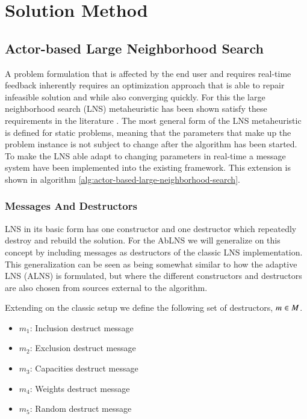 \section{Solution Method}
\label{sec:2-solution-method}

\subsection{Actor-based Large Neighborhood Search}
A problem formulation that is affected by the end user and requires real-time feedback
inherently requires an optimization approach that is able to repair infeasible solution
and while also converging quickly. For this the large neighborhood search (LNS)
metaheuristic has been shown satisfy these requirements in the literature
\cite{gendreauHandbookMetaheuristics2019}. The most general form of the LNS metaheuristic
is defined for static problems, meaning that the parameters that make up the problem instance
is not subject to change after the algorithm has been started. To make the
LNS able adapt to changing parameters in real-time a message system have been
implemented into the existing framework. This  extension is shown in algorithm
\ref{alg:actor-based-large-neighborhood-search}.

\subsubsection{Messages And Destructors}
LNS in its basic form has one constructor and one destructor which
repeatedly destroy and rebuild the solution. For the AbLNS we will generalize
on this concept by including messages as destructors of the classic LNS
implementation. This generalization can be seen as being somewhat similar to how
the adaptive LNS (ALNS) is formulated, but where the different constructors and
destructors are also chosen from sources external to the algorithm.

Extending on the classic setup we define the following set of destructors, $m_{}^{} \in M$.
\begin{itemize}
	\item $m_1$: Inclusion destruct message	
	\item $m_2$: Exclusion destruct message	
	\item $m_3$: Capacities destruct message	
	\item $m_4$: Weights destruct message	
	\item $m_5$: Random destruct message
\end{itemize}


